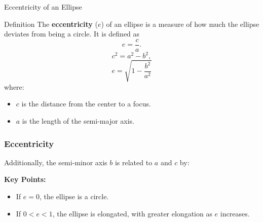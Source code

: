 \documentclass{beamer}
\begin{document}
 \begin{frame}{Eccentricity of an Ellipse}
  \begin{block}{Definition}
      The \textbf{eccentricity} ($e$) of an ellipse is a measure of how much the ellipse deviates from being a circle. It is defined as
      \[
      e = \frac{c}{a} .
      \]
      \[
  c^2 = a^2 - b^2,
  \]
  \[e = \sqrt{1 - \frac{b^2}{a^2}}\]
      where:
      \begin{itemize}
          \item $c$ is the distance from the center to a focus.
          \item $a$ is the length of the semi-major axis.
      \end{itemize}
  \end{block}
  
  
 
\end{frame}

\begin{frame}
  \frametitle{Eccentricity}
  \bigskip
  \begin{center}
  \end{center}
  Additionally, the semi-minor axis $b$ is related to $a$ and $c$ by:
  
  \bigskip
  \textbf{Key Points:}
  \begin{itemize}
      \item If $e = 0$, the ellipse is a circle.
      \item If $0 < e < 1$, the ellipse is elongated, with greater elongation as $e$ increases.
  \end{itemize}
\end{frame}
\end{document}

